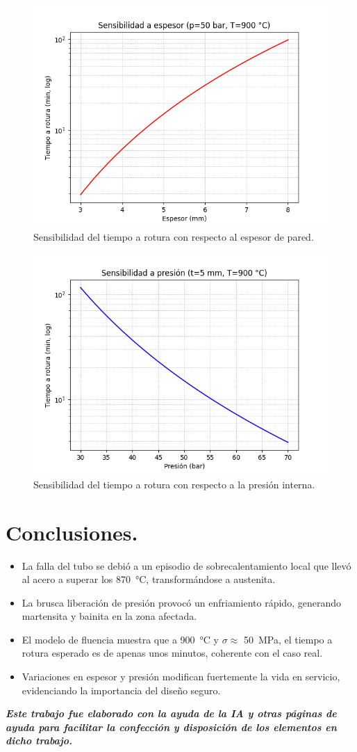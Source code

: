 \documentclass[12pt,a4paper]{article}
\begin{document}
\begin{figure}[H]
    \centering
    \includegraphics[width=0.7\linewidth]{sens_espesor.png}
    \caption{Sensibilidad del tiempo a rotura con respecto al espesor de pared.}
\end{figure}

\begin{figure}[H]
    \centering
    \includegraphics[width=0.7\linewidth]{sens_presion.png}
    \caption{Sensibilidad del tiempo a rotura con respecto a la presión interna.}
\end{figure}

\section{Conclusiones.}
\begin{itemize}
    \item La falla del tubo se debió a un episodio de sobrecalentamiento local que llevó al acero a superar los \SI{870}{\celsius}, transformándose a austenita.
    \item La brusca liberación de presión provocó un enfriamiento rápido, generando martensita y bainita en la zona afectada.
    \item El modelo de fluencia muestra que a \SI{900}{\celsius} y $\sigma \approx$ \SI{50}{\mega\pascal}, el tiempo a rotura esperado es de apenas unos minutos, coherente con el caso real.
    \item Variaciones en espesor y presión modifican fuertemente la vida en servicio, evidenciando la importancia del diseño seguro.
\end{itemize}

\vfill
\textit{\textbf{Este trabajo fue elaborado con la ayuda de la IA y otras páginas de ayuda para facilitar la confección y disposición de los elementos en dicho trabajo.}}
\end{document}
